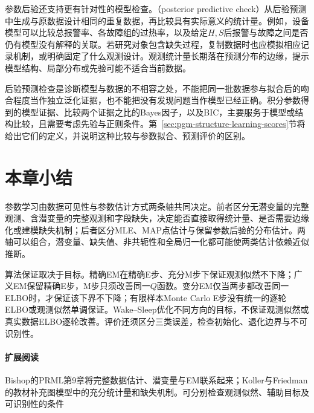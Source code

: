 参数后验还支持更有针对性的模型检查。（posterior predictive check）从后验预测中生成与原数据设计相同的重复数据，再比较具有实际意义的统计量。例如，设备模型可以比较总报警率、各故障组的过热率，以及给定$H,S$后报警与故障之间是否仍有模型没有解释的关联。若研究对象包含缺失过程，复制数据时也应模拟相应记录机制，或明确固定了什么观测设计。观测统计量长期落在预测分布的边缘，提示模型结构、局部分布或先验可能不适合当前数据。

后验预测检查是诊断模型与数据的不相容之处，不能把同一批数据参与拟合后的吻合程度当作独立泛化证据，也不能把没有发现问题当作模型已经正确。积分参数得到的模型证据、比较两个证据之比的Bayes因子，以及BIC，主要服务于模型或结构比较，且需要考虑先验与正则条件。第~\ref{sec:pgm-structure-learning-scores}节将给出它们的定义，并说明这种比较与参数拟合、预测评价的区别。

\section{本章小结}
\label{sec:pgm-parameter-learning-summary}

参数学习由数据可见性与参数估计方式两条轴共同决定。前者区分无潜变量的完整观测、含潜变量的完整观测和字段缺失，决定能否直接取得统计量、是否需要边缘化或建模缺失机制；后者区分MLE、MAP点估计与保留参数后验的分布估计。两轴可以组合，潜变量、缺失值、非共轭性和全局归一化都可能使两类估计依赖近似推断。

算法保证取决于目标。精确EM在精确E步、充分M步下保证观测似然不下降；广义EM保留精确E步，M步只须改善同一$Q$函数。变分EM仅当两步都改善同一ELBO时，才保证该下界不下降；有限样本Monte Carlo E步没有统一的逐轮ELBO或观测似然单调保证。Wake--Sleep优化不同方向的目标，不保证观测似然或真实数据ELBO逐轮改善。评价还须区分三类误差，检查初始化、退化边界与不可识别性。

\paragraph{扩展阅读}
Bishop的PRML第9章将完整数据估计、潜变量与EM联系起来；Koller与Friedman的教材补充图模型中的充分统计量和缺失机制。可分别检查观测似然、辅助目标及可识别性的条件
